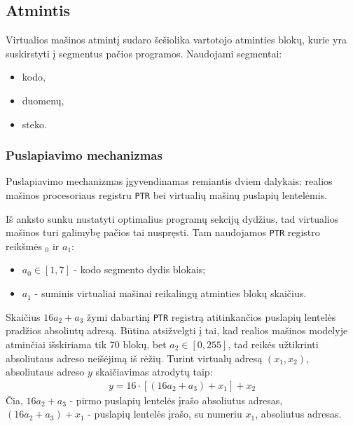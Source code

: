 \documentclass{scrartcl}
\begin{document}
        \subsection{Atmintis}
            Virtualios mašinos atmintį sudaro šešiolika vartotojo atminties blokų, kurie yra suskirstyti į segmentus pačios programos. Naudojami segmentai:
            \begin{itemize}
                \item kodo,
                \item duomenų,
                \item steko.
            \end{itemize}
            \subsubsection{Puslapiavimo mechanizmas}
                Puslapiavimo mechanizmas įgyvendinamas remiantis dviem dalykais: realios mašinos procesoriaus registru \texttt{PTR} bei virtualių mašinų puslapių lentelėmis.
                \par
                Iš anksto sunku nustatyti optimalius programų sekcijų dydžius, tad virtualios mašinos turi galimybę pačios tai nuspręsti. Tam naudojamos \texttt{PTR} registro reikšmės $_0$ ir $a_1$:
                    \begin{itemize}
                        \item $a_{0} \in [1, 7]$ - kodo segmento dydis blokais;
                        \item $a_{1}$ - suminis virtualiai mašinai reikalingų atminties blokų skaičius.
                    \end{itemize}
                \par
                Skaičius $16a_{2} + a_{3}$ žymi dabartinį \texttt{PTR} registrą atitinkančios puslapių lentelės pradžios absoliutų adresą. Būtina atsižvelgti į tai, kad realios mašinos modelyje atminčiai išskiriama tik 70 blokų, bet $a_{2} \in [0, 255]$, tad reikės užtikrinti absoliutaus adreso neišėjimą iš rėžių.
                Turint virtualų adresą $(x_{1}, x_{2})$, absoliutaus adreso $y$ skaičiavimas atrodytų taip:
                \begin{align*}
                    y = 16 \cdot \left[\left(16a_{2} + a_{3}\right) + x_{1}\right] + x_{2}
                \end{align*}
                Čia, $16a_{2} + a_{3}$ - pirmo puslapių lentelės įrašo absoliutus adresas, $\left(16a_{2} + a_{3}\right) + x_{1}$ - puslapių lentelės įrašo, su numeriu $x_{1}$, absoliutus adresas.
\end{document}
